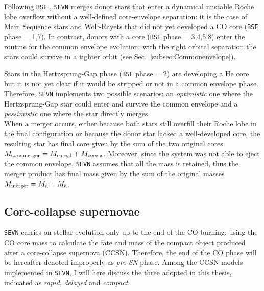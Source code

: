 \documentclass[a4paper,titlepage]{book}     	%
\begin{document}
Following \texttt{BSE} \cite{Hurley2002}, \texttt{SEVN} merges donor stars that enter a dynamical unstable Roche lobe overflow without a well-defined core-envelope separation: it is the case of Main Sequence stars and Wolf-Rayets that did not yet developed a CO core (\texttt{BSE} phase = 1,7). In contrast, donors with a core (\texttt{BSE} phase = 3,4,5,8) enter the routine for the common envelope evolution: with the right orbital separation the stars could survive in a tighter orbit (see Sec.\ \ref{subsec:Commonenvelope}). %

Stars in the Hertzsprung-Gap phase (\texttt{BSE} phase = 2) are developing a He core but it is not yet clear if it would be stripped or not in a common envelope phase. Therefore, \texttt{SEVN} implements two possible scenarios: an \emph{optimistic} one where the Hertzsprung-Gap star could enter and survive the common envelope and a \emph{pessimistic} one where the star directly merges. \\

When a merger occurs, either because both stars still overfill their Roche lobe in the final configuration or because the donor star lacked a well-developed core, the resulting star has final core given by the sum of the two original cores $M_{\rm core,merger} = M_{\rm core, d} + M_{\rm core, a}$. Moreover, since the system was not able to eject the common envelope, \texttt{SEVN} assumes that all the mass is retained, thus the merger product has final mass given by the sum of the original masses $M_{\rm merger} = M_{\rm d} + M_{\rm a}$.





\subsection{Core-collapse supernovae}\label{subsec:SNmodels}
\texttt{SEVN} carries on stellar evolution only up to the end of the CO burning, using the CO core mass to calculate the fate and mass of the compact object produced after a core-collapse supernova (CCSN). Therefore, the end of the CO phase will be hereafter denoted improperly as \emph{pre-SN} phase. Among the CCSN models implemented in \texttt{SEVN}, I will here discuss the three adopted in this thesis, indicated as \emph{rapid}, \emph{delayed} and \emph{compact}.
\end{document}
